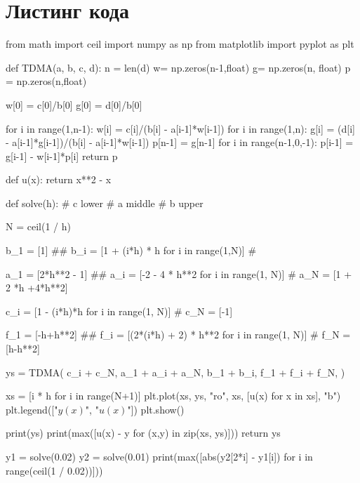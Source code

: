 \documentclass{article}
\begin{document}
\section*{Листинг кода}
\begin{python}
from math import ceil
import numpy as np
from matplotlib import pyplot as plt

def TDMA(a, b, c, d):
    n = len(d)
    w= np.zeros(n-1,float)
    g= np.zeros(n, float)
    p = np.zeros(n,float)
    
    w[0] = c[0]/b[0]
    g[0] = d[0]/b[0]

    for i in range(1,n-1):
        w[i] = c[i]/(b[i] - a[i-1]*w[i-1])
    for i in range(1,n):
        g[i] = (d[i] - a[i-1]*g[i-1])/(b[i] - a[i-1]*w[i-1])
    p[n-1] = g[n-1]
    for i in range(n-1,0,-1):
        p[i-1] = g[i-1] - w[i-1]*p[i]
    return p

def u(x):
    return x**2 - x

def solve(h):
    # c lower
    # a middle
    # b upper

    N = ceil(1 / h)

    b_1 = [1] ##
    b_i = [1 + (i*h) * h for i in range(1,N)] #

    a_1 = [2*h**2 - 1] ##
    a_i = [-2 - 4 * h**2 for i in range(1, N)] #
    a_N = [1 + 2 *h +4*h**2]

    c_i = [1 - (i*h)*h for i in range(1, N)] #
    c_N = [-1]
    
    f_1 = [-h+h**2] ##
    f_i = [(2*(i*h) + 2) * h**2 for i in range(1, N)] #
    f_N = [h-h**2]

    ys = TDMA(
        c_i + c_N,
        a_1 + a_i + a_N,
        b_1 + b_i,
        f_1 + f_i + f_N,
    )

    xs = [i * h for i in range(N+1)]
    plt.plot(xs, ys, "ro", xs, [u(x) for x in xs], "b")
    plt.legend(["$y(x)$", "$u(x)$"])
    plt.show()

    print(ys)
    print(max([u(x) - y for (x,y) in zip(xs, ys)]))
    return ys



y1 = solve(0.02)
y2 = solve(0.01)
print(max([abs(y2[2*i] - y1[i]) for i in range(ceil(1 / 0.02))]))




\end{python}
\end{document}
